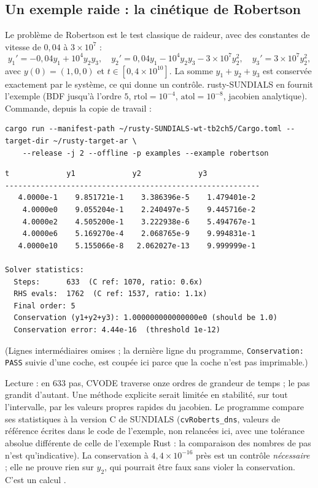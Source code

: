 \subsection{Un exemple raide : la cinétique de Robertson}
Le problème de Robertson est le test classique de raideur, avec des constantes de vitesse de $0{,}04$ à $3\times10^{7}$ :
\[y_1'=-0{,}04y_1+10^4y_2y_3,\quad y_2'=0{,}04y_1-10^4y_2y_3-3\times10^7y_2^2,\quad y_3'=3\times10^7y_2^2,\]
avec $y(0)=(1,0,0)$ et $t\in[0,4\times10^{10}]$. La somme $y_1+y_2+y_3$ est conservée exactement par le système, ce qui
donne un contrôle. rusty-SUNDIALS en fournit l'exemple  (BDF jusqu'à l'ordre $5$,
$\mathrm{rtol}=10^{-4}$, $\mathrm{atol}=10^{-8}$, jacobien analytique). Commande, depuis la copie de travail
 :
\begin{lstlisting}[style=appC,language={}]
cargo run --manifest-path ~/rusty-SUNDIALS-wt-tb2ch5/Cargo.toml --target-dir ~/rusty-target-ar \
    --release -j 2 --offline -p examples --example robertson
\end{lstlisting}
\begin{numbox}[: sortie réelle (2026-10-26, 43~s dont la compilation)]
\begin{lstlisting}[style=appC,language={}]
           t             y1             y2             y3
----------------------------------------------------------
   4.0000e-1    9.851721e-1    3.386396e-5    1.479401e-2
    4.0000e0    9.055204e-1    2.240497e-5    9.445716e-2
    4.0000e2    4.505200e-1    3.222938e-6    5.494767e-1
    4.0000e6    5.169270e-4    2.068765e-9    9.994831e-1
   4.0000e10    5.155066e-8   2.062027e-13    9.999999e-1

Solver statistics:
  Steps:      633  (C ref: 1070, ratio: 0.6x)
  RHS evals:  1762  (C ref: 1537, ratio: 1.1x)
  Final order: 5
  Conservation (y1+y2+y3): 1.000000000000000e0 (should be 1.0)
  Conservation error: 4.44e-16  (threshold 1e-12)
\end{lstlisting}
(Lignes intermédiaires omises ; la dernière ligne du programme, \texttt{Conservation: PASS} suivie d'une coche, est
coupée ici parce que la coche n'est pas imprimable.)
\end{numbox}
\noindent Lecture : en $633$ pas, CVODE traverse onze ordres de grandeur de temps ; le pas grandit d'autant. Une méthode
explicite serait limitée en stabilité, sur tout l'intervalle, par les valeurs propres rapides du jacobien. Le
programme compare ses statistiques à la version C de SUNDIALS (\texttt{cvRoberts\_dns}, valeurs de référence écrites
dans le code de l'exemple, non relancées ici, avec une tolérance absolue différente de celle de l'exemple Rust : la comparaison des nombres de pas n'est qu'indicative). La conservation à $4{,}4\times10^{-16}$ près est un contrôle
\emph{nécessaire} ; elle ne prouve rien sur $y_2$, qui pourrait être faux sans violer la conservation. C'est un calcul
\tierX.

